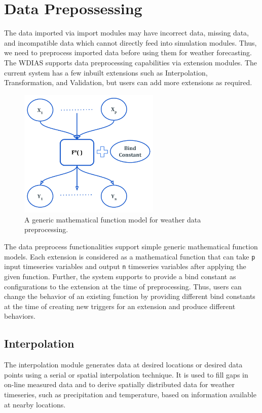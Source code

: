 \section{Data Prepossessing}
\label{se:data_preprocess}

The data imported via import modules may have incorrect data, missing data, and incompatible data which cannot directly feed into simulation modules.
Thus, we need to preprocess imported data before using them for weather forecasting. The WDIAS supports data preprocessing capabilities via extension modules. The current system has a few inbuilt extensions such as Interpolation, Transformation, and Validation, but users can add more extensions as required.

\begin{figure}[htp]
    \centering
    \includegraphics[width=0.6\textwidth]{method/data_preprocess/weather_data_preprocessing.pdf}
    \caption{A generic mathematical function model for weather data preprocessing.}
    \label{fi:weather_data_preprocessing}
\end{figure}

The data preprocess functionalities support simple generic mathematical function models. Each extension is considered as a mathematical function that can take \texttt{p} input timeseries variables and output \texttt{n} timeseries variables after applying the given function. Further, the system supports to provide a bind constant as configurations to the extension at the time of preprocessing. Thus, users can change the behavior of an existing function by providing different bind constants at the time of creating new triggers for an extension and produce different behaviors.

\subsection{Interpolation}
The interpolation module generates data at desired locations or desired data points using a serial or spatial interpolation technique. It is used to fill gaps in on-line measured data and to derive spatially distributed data for weather timeseries, such as precipitation and temperature, based on information available at nearby locations.

